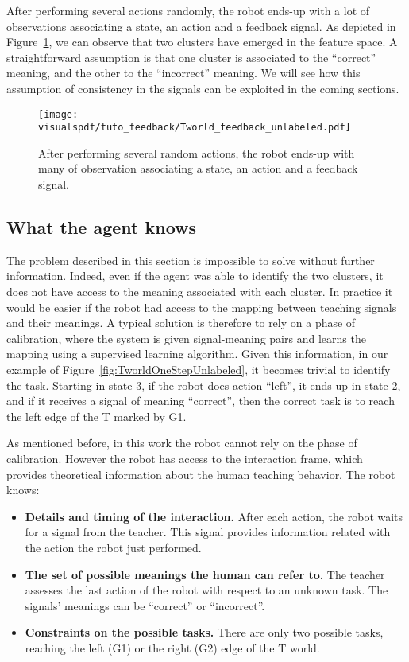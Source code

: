 After performing several actions randomly, the robot ends-up with a lot of observations associating a state, an action and a feedback signal. As depicted in Figure~\ref{fig:TworldManyStepUnlabeled}, we can observe that two clusters have emerged in the feature space. A straightforward assumption is that one cluster is associated to the ``correct'' meaning, and the other to the ``incorrect'' meaning. We will see how this assumption of consistency in the signals can be exploited in the coming sections.

\begin{figure}[!htbp]
  \centering
  \texttt{[image: \\visualspdf/tuto\_feedback/Tworld\_feedback\_unlabeled.pdf]}
  \caption{After performing several random actions, the robot ends-up with many of observation associating a state, an action and a feedback signal.}
  \label{fig:TworldManyStepUnlabeled}
\end{figure}


\subsection{What the agent knows}

The problem described in this section is impossible to solve without further information. Indeed, even if the agent was able to identify the two clusters, it does not have access to the meaning associated with each cluster. In practice it would be easier if the robot had access to the mapping between teaching signals and their meanings. A typical solution is therefore to rely on a phase of calibration, where the system is given signal-meaning pairs and learns the mapping using a supervised learning algorithm. Given this information, in our example of Figure~\ref{fig:TworldOneStepUnlabeled}, it becomes trivial to identify the task. Starting in state 3, if the robot does action ``left'', it ends up in state 2, and if it receives a signal of meaning ``correct'', then the correct task is to reach the left edge of the T marked by G1.

As mentioned before, in this work the robot cannot rely on the phase of calibration. However the robot has access to the interaction frame, which provides theoretical information about the human teaching behavior. The robot knows:
\begin{itemize}

\item \textbf{Details and timing of the interaction.} After each action, the robot waits for a signal from the teacher. This signal provides information related with the action the robot just performed.

\item \textbf{The set of possible meanings the human can refer to.} The teacher assesses the last action of the robot with respect to an unknown task. The signals' meanings can be ``correct'' or ``incorrect''.

\item \textbf{Constraints on the possible tasks.} There are only two possible tasks, reaching the left (G1) or the right (G2) edge of the T world.

\end{itemize}

